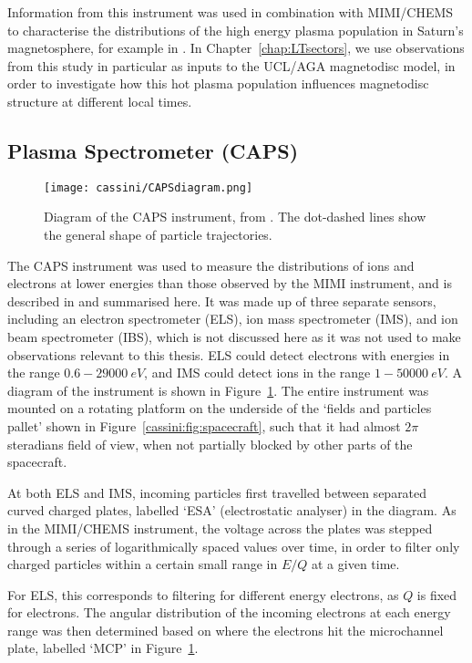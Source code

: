 Information from this instrument was used in combination with MIMI/CHEMS to characterise the distributions of the high energy plasma population in Saturn's magnetosphere, for example in \citet{sergis2017}. In Chapter~\ref{chap:LTsectors}, we use observations from this study in particular as inputs to the UCL/AGA magnetodisc model, in order to investigate how this hot plasma population influences magnetodisc structure at different local times.

\subsection{Plasma Spectrometer (CAPS)}
\begin{figure}
\centering
\noindent\texttt{[image: cassini/CAPSdiagram.png]}
\caption[Diagram of the CAPS instrument.]{Diagram of the CAPS instrument, from \citet{young2004}. The dot-dashed lines show the general shape of particle trajectories.}
\label{cassini:fig:CAPSdiagram}
\end{figure}

The CAPS instrument was used to measure the distributions of ions and electrons at lower energies than those observed by the MIMI instrument, and is described in \citet{young2004} and summarised here. It was made up of three separate sensors, including an electron spectrometer (ELS), ion mass spectrometer (IMS), and ion beam spectrometer (IBS), which is not discussed here as it was not used to make observations relevant to this thesis. ELS could detect electrons with energies in the range ${0.6}{-}\SI{29000}{eV}$, and IMS could detect ions in the range ${1}{-}\SI{50000}{eV}$. A diagram of the instrument is shown in Figure~\ref{cassini:fig:CAPSdiagram}. The entire instrument was mounted on a rotating platform on the underside of the `fields and particles pallet' shown in Figure~\ref{cassini:fig:spacecraft}, such that it had almost $2\pi$ steradians field of view, when not partially blocked by other parts of the spacecraft.

At both ELS and IMS, incoming particles first travelled between separated curved charged plates, labelled `ESA' (electrostatic analyser) in the diagram. As in the MIMI/CHEMS instrument, the voltage across the plates was stepped through a series of logarithmically spaced values over time, in order to filter only charged particles within a certain small range in $E/Q$ at a given time. 

For ELS, this corresponds to filtering for different energy electrons, as $Q$ is fixed for electrons. The angular distribution of the incoming electrons at each energy range was then determined based on where the electrons hit the microchannel plate, labelled `MCP' in Figure~\ref{cassini:fig:CAPSdiagram}. 

